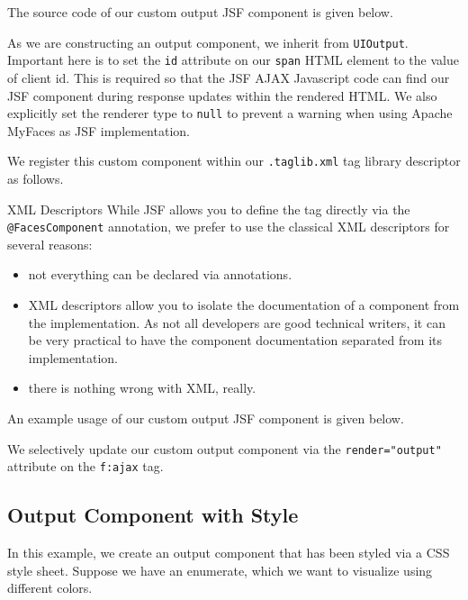 The source code of our custom output JSF component is given below.

As we are constructing an output component, we inherit from \texttt{UIOutput}.
Important here is to set the \texttt{id} attribute on our \texttt{span} HTML element to the value of client id.
This is required so that the JSF AJAX Javascript code can find our JSF component during response updates within the rendered HTML.
We also explicitly set the renderer type to \texttt{null} to prevent a warning when using Apache MyFaces \cite{myfaces} as JSF implementation.

We register this custom component within our \texttt{.taglib.xml} tag library descriptor as follows.


\begin{TIP}{XML Descriptors}
While JSF allows you to define the tag directly via the \texttt{@FacesComponent} annotation,
we prefer to use the classical XML descriptors for several reasons:
\begin{itemize}
	\item not everything can be declared via annotations.
	\item XML descriptors allow you to isolate the documentation of a component from the implementation.
	As not all developers are good technical writers, it can be very practical to have the component documentation separated from its implementation.
	\item there is nothing wrong with XML, really.
\end{itemize}
\end{TIP}

An example usage of our custom output JSF component is given below.

We selectively update our custom output component via the \texttt{render="output"} attribute on the \texttt{f:ajax} tag.

\subsection{Output Component with Style}

In this example, we create an output component that has been styled via a CSS style sheet.
Suppose we have an enumerate, which we want to visualize using different colors.


